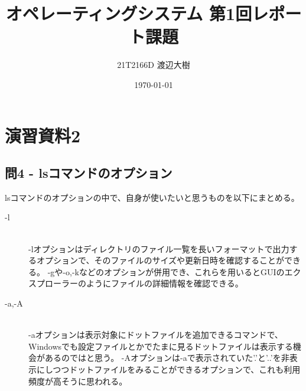 \documentclass[a4paper,11pt]{jsarticle}
\begin{document}
\title{オペレーティングシステム 第1回レポート課題}
\author{21T2166D 渡辺大樹}
\date{\today}
\maketitle

\section*{演習資料2}
\subsection*{問4 - lsコマンドのオプション}
lsコマンドのオプションの中で、自身が使いたいと思うものを以下にまとめる。
\begin{description}
    \item[-l] \mbox{}\\
    -lオプションはディレクトリのファイル一覧を長いフォーマットで出力するオプションで、そのファイルのサイズや更新日時を確認することができる。
    -gや-o,-kなどのオプションが併用でき、これらを用いるとGUIのエクスプローラーのようにファイルの詳細情報を確認できる。
    \item[-a,-A] \mbox{}\\
    -aオプションは表示対象にドットファイルを追加できるコマンドで、Windowsでも設定ファイルとかでたまに見るドットファイルは表示する機会があるのではと思う。
    -Aオプションは-aで表示されていた'.'と'..'を非表示にしつつドットファイルをみることができるオプションで、これも利用頻度が高そうに思われる。
    \item[] \mbox{}\\
    
    \item[] \mbox{}\\
    
    \item[] \mbox{}\\
    
\end{description}
\end{document}
